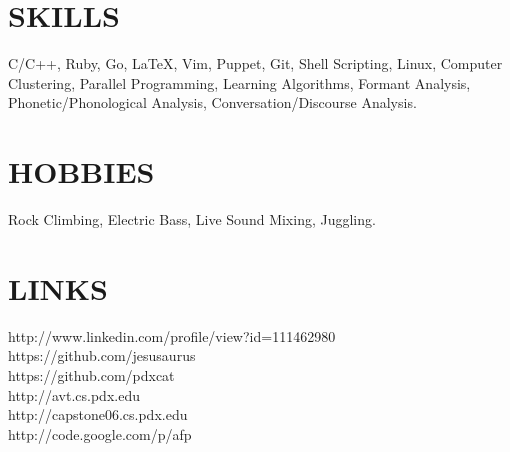 \documentclass[overlapped]{res}
\begin{document}
\begin{resume}
\section{SKILLS} 
\vspace{7pt} 
C/C++, Ruby, Go, LaTeX, Vim, Puppet, Git, Shell Scripting, Linux, Computer Clustering, Parallel Programming, Learning Algorithms, Formant Analysis, Phonetic/Phonological Analysis, Conversation/Discourse Analysis.

\section{HOBBIES} 
\vspace{7pt} 
Rock Climbing, Electric Bass, Live Sound Mixing, Juggling.

\section{LINKS}
\vspace{7pt}
http://www.linkedin.com/profile/view?id=111462980\\
https://github.com/jesusaurus\\
https://github.com/pdxcat\\
http://avt.cs.pdx.edu\\
http://capstone06.cs.pdx.edu\\
http://code.google.com/p/afp\\

\end{resume}
\end{document}
